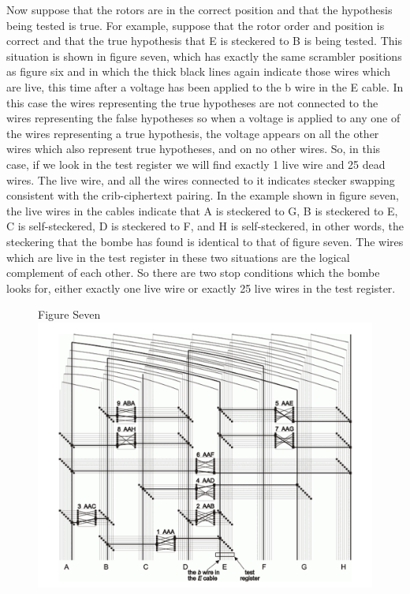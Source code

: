 \documentclass[12pt,a4paper]{article}
\begin{document}
Now suppose that the rotors are in the correct position and that the hypothesis being tested is true. For example, suppose that the rotor order and position is correct and that the true hypothesis that E is steckered to B is being tested. This situation is shown in figure seven, which has exactly the same scrambler positions as figure six and in which the thick black lines again indicate those wires which are live, this time after a voltage has been applied to the b wire in the E cable. In this case the wires representing the true hypotheses are not connected to the wires representing the false hypotheses so when a voltage is applied to any one of the wires representing a true hypothesis, the voltage appears on all the other wires which also represent true hypotheses, and on no other wires. So, in this case, if we look in the test register we will find exactly 1 live wire and 25 dead wires. The live wire, and all the wires connected to it indicates stecker swapping consistent with the crib-ciphertext pairing. In the example shown in figure seven, the live wires in the cables indicate that A is steckered to G, B is steckered to E, C is self-steckered, D is steckered to F, and H is self-steckered, in other words, the steckering that the bombe has found is identical to that of figure seven. The wires which are live in the test register in these two situations are the logical complement of each other. So there are two stop conditions which the bombe looks for, either exactly one live wire or exactly 25 live wires in the test register.

\begin{figure}[h]
\centering
Figure Seven
\includegraphics[width=\textwidth]{BOMBEfive.png}
\end{figure}
\end{document}
